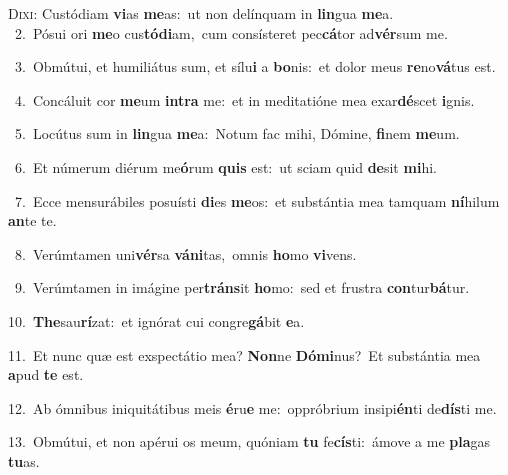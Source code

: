 \lettrine{\initial\textcolor{\initialcolor}{D}}{ixi:} Custódiam \textbf{vi}\-as \textbf{me}\-as:~\star ut non delínquam in \textbf{lin}\-gua \textbf{me}\-a.\\
{\numbfont\textcolor{\numbcolor}{~2.}}~Pósui ori \textbf{me}\-o cus\-\textbf{tó}\-\textbf{di}am,~\star cum consísteret pec\-\textbf{cá}\-tor ad\-\textbf{vér}\-sum me.\par
{\numbfont\textcolor{\numbcolor}{~3.}}~Obmútui, et humiliátus sum, et sílu\textbf{i} a \textbf{bo}\-nis:~\star et dolor meus \textbf{re}\-no\-\textbf{vá}\-tus est.\par
{\numbfont\textcolor{\numbcolor}{~4.}}~Concáluit cor \textbf{me}\-um \textbf{in}\-\textbf{tra} me:~\star et in meditatióne mea exar\-\textbf{dé}\-scet \textbf{i}\-gnis.\par
{\numbfont\textcolor{\numbcolor}{~5.}}~Locútus sum in \textbf{lin}\-gua \textbf{me}\-a:~\star Notum fac mihi, Dómine, \textbf{fi}\-nem \textbf{me}\-um.\par
{\numbfont\textcolor{\numbcolor}{~6.}}~Et númerum diérum me\-\textbf{ó}\-rum \textbf{quis} est:~\star ut sciam quid \textbf{de}\-sit \textbf{mi}\-hi.\par
{\numbfont\textcolor{\numbcolor}{~7.}}~Ecce mensurábiles posuísti \textbf{di}\-es \textbf{me}\-os:~\star et substántia mea tamquam \textbf{ní}\-hilum \textbf{an}\-te te.\par
{\numbfont\textcolor{\numbcolor}{~8.}}~Verúmtamen uni\-\textbf{vér}\-sa \textbf{vá}\-\textbf{ni}tas,~\star omnis \textbf{ho}\-mo \textbf{vi}\-vens.\par
{\numbfont\textcolor{\numbcolor}{~9.}}~Verúmtamen in imágine per\-\textbf{tráns}\-it \textbf{ho}\-mo:~\star sed et frustra \textbf{con}\-tur\-\textbf{bá}\-tur.\par
{\numbfont\textcolor{\numbcolor}{10.}}~\-\textbf{The}\-sau\-\textbf{rí}\-zat:~\star et ignórat cui congre\-\textbf{gá}\-bit \textbf{e}\-a.\par
{\numbfont\textcolor{\numbcolor}{11.}}~Et nunc quæ est exspectátio mea? \textbf{Non}\-ne \textbf{Dó}\-\textbf{mi}nus?~\star Et substántia mea \textbf{a}\-pud \textbf{te} est.\par
{\numbfont\textcolor{\numbcolor}{12.}}~Ab ómnibus iniquitátibus meis \textbf{é}\-ru\textbf{e} me:~\star oppróbrium insipi\-\textbf{én}\-ti de\-\textbf{dís}\-ti me.\par
{\numbfont\textcolor{\numbcolor}{13.}}~Obmútui, et non apérui os meum, quóniam \textbf{tu} fe\-\textbf{cís}\-ti:~\star ámove a me \textbf{pla}\-gas \textbf{tu}\-as.\par
